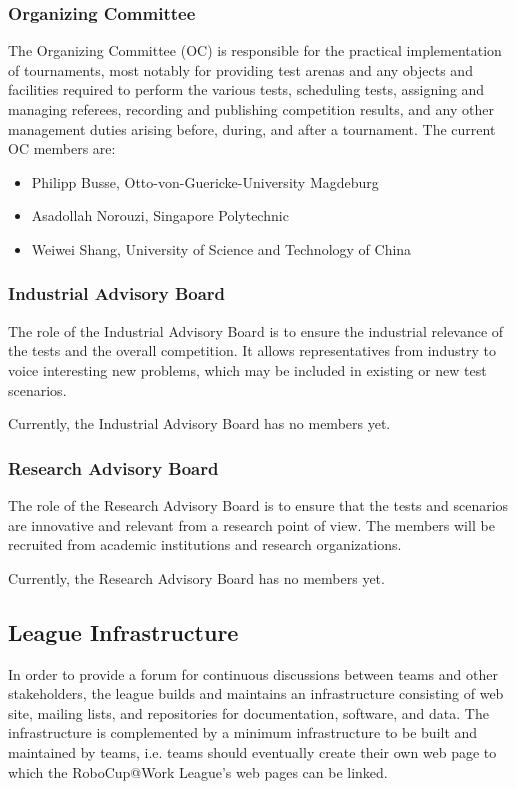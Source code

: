 \subsubsection{Organizing Committee}
The Organizing Committee (OC) is responsible for the practical implementation of tournaments, most notably for providing test arenas and any objects and facilities required to perform the various tests, scheduling tests, assigning and managing referees, recording and publishing competition results, and any other management duties arising before, during, and after a tournament. The current OC members are:

\begin{itemize}
	\item Philipp Busse, Otto-von-Guericke-University Magdeburg
	\item Asadollah Norouzi, Singapore Polytechnic
	\item Weiwei Shang, University of Science and Technology of China
\end{itemize}

\subsubsection{Industrial Advisory Board}
The role of the Industrial Advisory Board is to ensure the industrial relevance of the tests and the overall competition. It allows representatives from industry to voice interesting new problems, which may be included in existing or new test scenarios. 
\par
Currently, the Industrial Advisory Board has no members yet.

\subsubsection{ Research Advisory Board}
The role of the Research Advisory Board is to ensure that the tests and scenarios are innovative and relevant from a research point of view. The members will be recruited from academic institutions and research organizations.
\par
Currently, the Research Advisory Board has no members yet.

\subsection{League Infrastructure}
In order to provide a forum for continuous discussions between teams and other stakeholders, the league builds and maintains an infrastructure consisting of web site, mailing lists, and repositories for documentation, software, and data. The infrastructure is complemented by a minimum infrastructure to be built and maintained by teams, i.e. teams should eventually create their own web page to which the RoboCup@Work League’s web pages can be linked.

